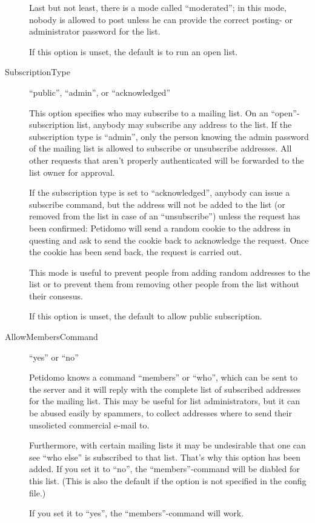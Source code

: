 \documentclass[a4paper,10pt]{scrreprt}
\begin{document}
\begin{description}
Last but not least, there is a mode called ``moderated''; in this
mode, nobody is allowed to post unless he can provide the correct
posting- or administrator password for the list.

If this option is unset, the default is to run an open list.

\item[SubscriptionType] \hfill ``public'', ``admin'', or ``acknowledged''

This option specifies who may subscribe to a mailing list. On an
``open''-subscription list, anybody may subscribe any address to the
list. If the subscription type is ``admin'', only the person knowing
the admin password of the mailing list is allowed to subscribe or
unsubscribe addresses. All other requests that aren't properly
authenticated will be forwarded to the list owner for approval.

If the subscription type is set to ``acknowledged'', anybody can issue
a subscribe command, but the address will not be added to the list (or
removed from the list in case of an ``unsubscribe'') unless the
request has been confirmed: Petidomo will send a random cookie to the
address in questing and ask to send the cookie back to acknowledge the
request. Once the cookie has been send back, the request is carried
out.

This mode is useful to prevent people from adding random addresses to
the list or to prevent them from removing other people from the list
without their consesus.

If this option is unset, the default to allow public subscription.

\item[AllowMembersCommand] \hfill ``yes'' or ``no''

Petidomo knows a command ``members'' or ``who'', which can be sent
to the server and it will reply with the complete list of subscribed
addresses for the mailing list. This may be useful for list
administrators, but it can be abused easily by spammers, to collect
addresses where to send their unsolicted commercial e-mail to.

Furthermore, with certain mailing lists it may be undesirable that one
can see ``who else'' is subscribed to that list. That's why this
option has been added. If you set it to ``no'', the
``members''-command will be diabled for this list. (This is also the
default if the option is not specified in the config file.)

If you set it to ``yes'', the ``members''-command will work.


\end{description}
\end{document}
